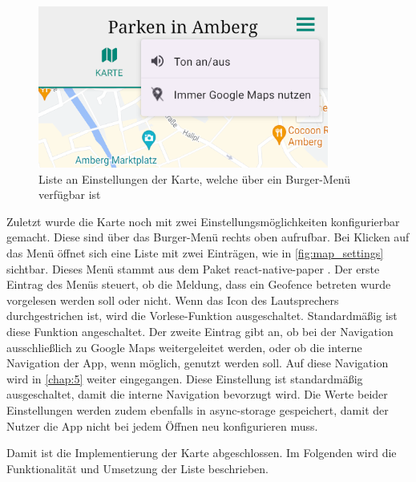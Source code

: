 \begin{figure}
	\vspace{-\baselineskip}
	\centering
	\includegraphics[scale=1]{img/map_settings}
	\caption{Liste an Einstellungen der Karte, welche über ein Burger-Menü verfügbar ist}
	\label{fig:map_settings}
\end{figure}
Zuletzt wurde die Karte noch mit zwei Einstellungsmöglichkeiten konfigurierbar gemacht. Diese sind über das Burger-Menü rechts oben aufrufbar. Bei Klicken auf das Menü öffnet sich eine Liste mit zwei Einträgen, wie in \autoref{fig:map_settings} sichtbar. Dieses Menü stammt aus dem Paket react-native-paper \cite{paper}. Der erste Eintrag des Menüs steuert, ob die Meldung, dass ein Geofence betreten wurde vorgelesen werden soll oder nicht. Wenn das Icon des Lautsprechers durchgestrichen ist, wird die Vorlese-Funktion ausgeschaltet. Standardmäßig ist diese Funktion angeschaltet. Der zweite Eintrag gibt an, ob bei der Navigation ausschließlich zu Google Maps weitergeleitet werden, oder ob die interne Navigation der App, wenn möglich, genutzt werden soll. Auf diese Navigation wird in \autoref{chap:5} weiter eingegangen. Diese Einstellung ist standardmäßig ausgeschaltet, damit die interne Navigation bevorzugt wird. Die Werte beider Einstellungen werden zudem ebenfalls in async-storage gespeichert, damit der Nutzer die App nicht bei jedem Öffnen neu konfigurieren muss.

Damit ist die Implementierung der Karte abgeschlossen. Im Folgenden wird die Funktionalität und Umsetzung der Liste beschrieben.
